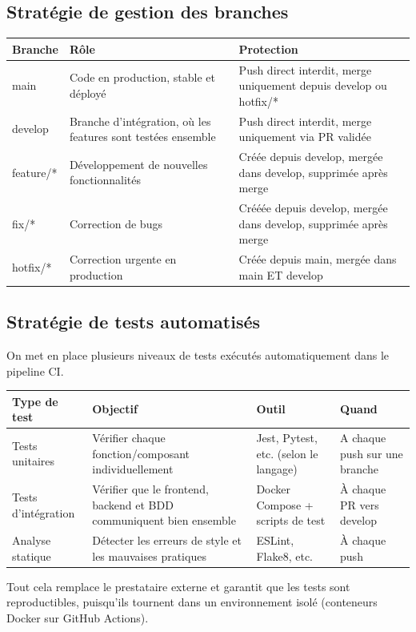 \documentclass{article}
\begin{document}
\subsection{Stratégie de gestion des branches}

\begin{tabularx}{\textwidth}{|l|X|X|}
\hline
\textbf{Branche} & \textbf{Rôle} & \textbf{Protection} \\
\hline
main & Code en production, stable et déployé & Push direct interdit, merge uniquement depuis develop ou hotfix/* \\
\hline
develop & Branche d'intégration, où les features sont testées ensemble & Push direct interdit, merge uniquement via PR validée \\
\hline
feature/* & Développement de nouvelles fonctionnalités & Créée depuis develop, mergée dans develop, supprimée après merge \\
\hline
fix/* & Correction de bugs & Crééée depuis develop, mergée dans develop, supprimée après merge \\
\hline
hotfix/* & Correction urgente en production & Créée depuis main, mergée dans main ET develop \\
\hline
\end{tabularx}

\subsection{Stratégie de tests automatisés}

On met en place plusieurs niveaux de tests exécutés automatiquement dans le pipeline CI. 

\begin{tabularx}{\textwidth}{|l|X|X|X|}
\hline
\textbf{Type de test} & \textbf{Objectif} & \textbf{Outil} & \textbf{Quand} \\
\hline
Tests unitaires & Vérifier chaque fonction/composant individuellement & Jest, Pytest, etc. (selon le langage) & A chaque push sur une branche \\
\hline
Tests d'intégration & Vérifier que le frontend, backend et BDD communiquent bien ensemble & Docker Compose + scripts de test & À chaque PR vers develop \\
\hline
Analyse statique & Détecter les erreurs de style et les mauvaises pratiques & ESLint, Flake8, etc. & À chaque push \\
\hline
\end{tabularx}

Tout cela remplace le prestataire externe et garantit que les tests sont reproductibles, puisqu'ils tournent dans un environnement isolé (conteneurs Docker sur GitHub Actions).
\end{document}
